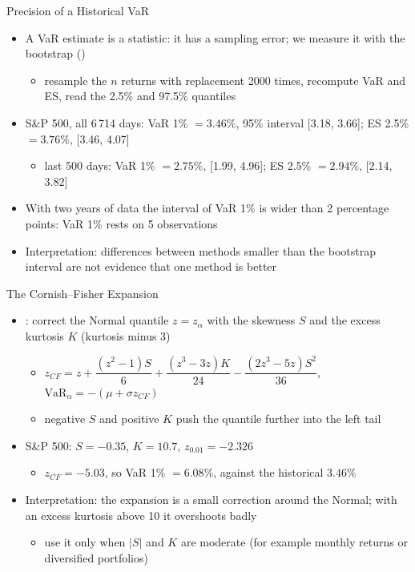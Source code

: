\begin{frame}{Precision of a Historical VaR}
\itemsize{\footnotesize}
\begin{itemize}
    \item A VaR estimate is a statistic: it has a sampling error; we measure it with the bootstrap ()
    \begin{itemize}
        \item resample the $n$ returns with replacement 2000 times, recompute VaR and ES, read the 2.5\% and 97.5\% quantiles
    \end{itemize}
    \item S\&P 500, all 6\,714 days: VaR 1\% $= 3.46\%$, 95\% interval [3.18, 3.66]; ES 2.5\% $= 3.76\%$, [3.46, 4.07]
    \begin{itemize}
        \item last 500 days: VaR 1\% $= 2.75\%$, [1.99, 4.96]; ES 2.5\% $= 2.94\%$, [2.14, 3.82]
    \end{itemize}
    \item With two years of data the interval of VaR 1\% is wider than 2 percentage points: VaR 1\% rests on 5 observations
    \item Interpretation: differences between methods smaller than the bootstrap interval are not evidence that one method is better
\end{itemize}
\end{frame}

\begin{frame}{The Cornish--Fisher Expansion}
\itemsize{\footnotesize}
\begin{itemize}
    \item {}: correct the Normal quantile $z = z_\alpha$ with the skewness $S$ and the excess kurtosis $K$ (kurtosis minus 3)
    \begin{itemize}
        \item $z_{CF} = z + \dfrac{(z^2 - 1)S}{6} + \dfrac{(z^3 - 3z)K}{24} - \dfrac{(2z^3 - 5z)S^2}{36}$, \quad $\mathrm{VaR}_\alpha = -(\mu + \sigma z_{CF})$
        \item negative $S$ and positive $K$ push the quantile further into the left tail
    \end{itemize}
    \item S\&P 500: $S = -0.35$, $K = 10.7$, $z_{0.01} = -2.326$
    \begin{itemize}
        \item $z_{CF} = -5.03$, so VaR 1\% $= 6.08\%$, against the historical $3.46\%$
    \end{itemize}
    \item Interpretation: the expansion is a small correction around the Normal; with an excess kurtosis above 10 it overshoots badly
    \begin{itemize}
        \item use it only when $|S|$ and $K$ are moderate (for example monthly returns or diversified portfolios)
    \end{itemize}
\end{itemize}
\end{frame}

